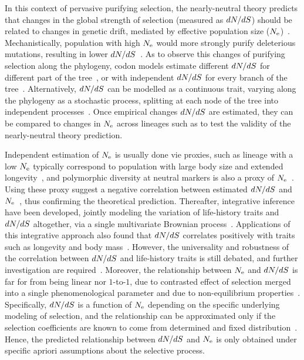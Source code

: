 In this context of pervasive purifying selection, the nearly-neutral theory predicts that changes in the global strength of selection (measured as $dN/dS$) should be related to changes in genetic drift, mediated by effective population size ($N_{\mathrm{e}}$)~\citep{Ohta1992}.
Mechanistically, population with high $N_{\mathrm{e}}$ would more strongly purify deleterious mutations, resulting in lower $dN/dS$~\citep{Kimura1979, Welch2008}.
As to observe this changes of purifying selection along the phylogeny, codon models estimate different $dN/dS$ for different part of the tree~\citep{Dutheil2012}, or with independent $dN/dS$ for every branch of the tree~\citep{Popadin2007}.
Alternatively, $dN/dS$ can be modelled as a continuous trait, varying along the phylogeny as a stochastic process, splitting at each node of the tree into independent processes~\citep{Seo2004,Lartillot2011}.
Once empirical changes $dN/dS$ are estimated, they can be compared to changes in $N_{\mathrm{e}}$ across lineages such as to test the validity of the nearly-neutral theory prediction.

Independent estimation of $N_{\mathrm{e}}$ is usually done vie proxies, such as lineage with a low $N_{\mathrm{e}}$ typically correspond to population with large body size and extended longevity~\citep{Romiguier2014}, and polymorphic diversity at neutral markers is also a proxy of $N_{\mathrm{e}}$~\citep{Galtier2016}.
Using these proxy suggest a negative correlation between estimated $dN/dS$ and $N_{\mathrm{e}}$~\citep{Popadin2007, Lanfear2010, Romiguier2014}, thus confirming the theoretical prediction.
Thereafter, integrative inference have been developed, jointly modeling the variation of life-history traits and $dN/dS$ altogether, via a single multivariate Brownian process~\citep{Lartillot2011}.
Applications of this integrative approach also found that $dN/dS$ correlates positively with traits such as longevity and body mass~\citep{Lartillot2011, Figuet2017}.
However, the universality and robustness of the correlation between $dN/dS$ and life-history traits is still debated, and further investigation are required~\citep{Nabholz2013,Lanfear2014,Figuet2016, Bolivar2019}.
Moreover, the relationship between $N_{\mathrm{e}}$ and $dN/dS$ is far for from being linear nor $1$-to-$1$, due to contrasted effect of selection merged into a single phenomenological parameter and due to non-equilibrium properties~\citep{Jones2016}.
Specifically, $dN/dS$ is a function of $N_{\mathrm{e}}$ depending on the specific underlying modeling of selection, and the relationship can be approximated only if the selection coefficients are known to come from determined and fixed distribution~\citep{Nielsen2003, Welch2008}.
Hence, the predicted relationship between $dN/dS$ and $N_{\mathrm{e}}$ is only obtained under specific apriori assumptions about the selective process.

